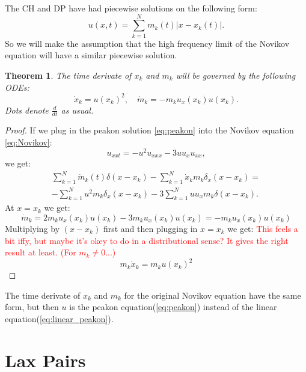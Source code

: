 \documentclass[english,master]{liumaiex}
\theoremstyle{plain}
\newtheorem{theorem}[proposition]{Theorem}
\theoremstyle{definition}
\newcommand\todo[1]{\textcolor{red}{#1}}
\begin{document}
The CH and DP have had piecewise solutions on the following form:
\begin{equation} \label{eq:linear_peakon}
	u(x, t) = \sum_{k = 1}^{N} m_k(t) |x - x_k(t)|.
\end{equation}
So we will make the assumption that the high frequency limit of the Novikov equation will have a similar piecewise solution.
\begin{theorem}
	\label{thm:real-spectrum}
	The time derivate of $x_k$ and $m_k$ will be governed by the following ODEs:
	\begin{equation} \label{eq:peakon_odes}
	\dot{x}_k = u(x_k)^2, \quad
	\dot{m}_k = -m_ku_x(x_k)u(x_k).
	\end{equation}
	Dots denote $\frac{d}{dt}$ as usual.
\end{theorem}
\begin{proof}
	If we plug in the peakon solution \eqref{eq:peakon} into the Novikov equation \eqref{eq:Novikov}:
	\begin{equation}
		u_{xxt} = -u^2u_{xxx} - 3uu_xu_{xx},
	\end{equation}
	we get:
	\begin{equation}
	\begin{aligned}
		\sum_{k = 1}^{N} \dot{m}_k(t)\delta(x - x_k) 
		-\sum_{k = 1}^{N}\dot{x}_k m_k\delta_x(x - x_k) =\\
		-\sum_{k = 1}^{N}u^2m_k\delta_x(x - x_k)
		-3\sum_{k = 1}^{N}uu_xm_k\delta(x - x_k).
	\end{aligned}
	\end{equation}
	At $x = x_k$ we get:
	\begin{equation}
		\dot{m}_k =
		2m_ku_x(x_k)u(x_k) -3m_ku_x(x_k)u(x_k) =
		-m_ku_x(x_k)u(x_k)
	\end{equation}
	Multiplying by $(x - x_k)$ first and then plugging in $x = x_k$ we get: \todo{This feels a bit iffy, but maybe it's okey to do in a distributional sense? It gives the right result at least. (For $m_k \ne 0$...)}
	\begin{equation}
		m_k\dot{x}_k = m_k u(x_k)^2
	\end{equation}
\end{proof}
The time derivate of $x_k$ and $m_k$ for the original Novikov equation have the same form, but then $u$ is the peakon equation(\ref{eq:peakon}) instead of the linear equation(\ref{eq:linear_peakon}).

\section{Lax Pairs}
\end{document}

